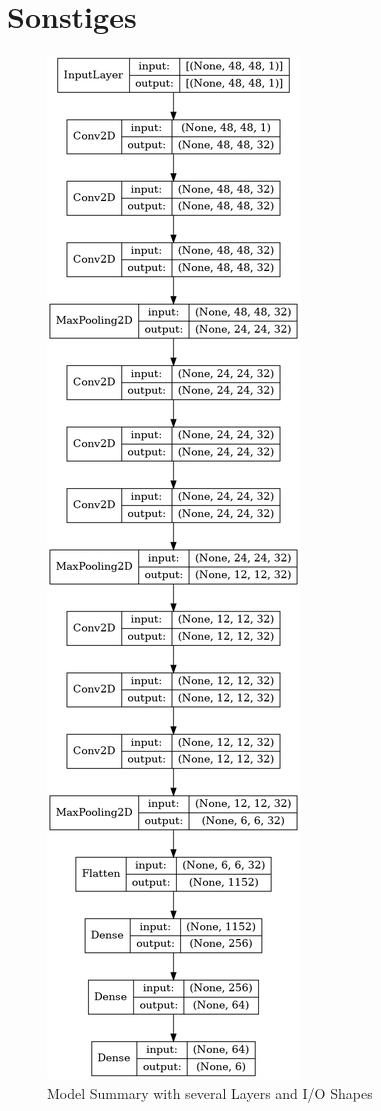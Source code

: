 \documentclass[12pt, a4paper]{report}
\begin{document}
\section*{Sonstiges}
\begin{figure}[h]
  \center
  \includegraphics[scale=0.35]{Bilder/ModelSummary.png}
  \caption{ Model Summary with several Layers and I/O Shapes }
  \label{fig:Model Summary}
  \end{figure}
\end{document}
